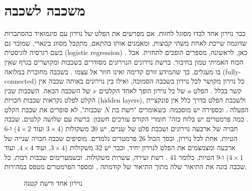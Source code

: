 \section{משכבה לשכבה}
כבר נוירון אחד לבדו מסוגל לחזות. אם מפרשים את הפלט של נוירון עם סיגמואיד כהסתברות שדוגמה שייכת לאחת משתי קבוצות, ומאמנים אותו בהתאם, מתקבל מסווג בינארי, שמוכר גם בשם רגרסיה לוגיסטית (logistic regression) \cite{S-ch03-01}. כאן, לראשונה, מספרים הופכים לתחזית.
אבל הכוח האמיתי טמון בחיבור. ברשת נוירונים הנוירונים מסודרים בשכבות ומקושרים בגרף שאין בו מעגלים, כך שהמידע זורם קדימה ואינו חוזר אל עצמו \cite{S-ch03-01}. בשכבה מחוברת במלואה (fully-connected) כל נוירון מקושר לכל נוירון בשכבה הסמוכה, ואילו בין נוירונים באותה שכבה אין קשר בכלל \cite{S-ch03-01}. הפלט $a$ של כל נוירון הופך לאחד הקלטים $x$ של השכבה הבאה. השכבות שבין הקלט לפלט נקראות שכבות חבויות (hidden layers), ולשכבת הפלט בדרך כלל אין פונקציית הפעלה \cite{S-ch03-01}. ובספירה יש מוסכמה: כשאומרים "רשת בת $N$ שכבות", לא סופרים את שכבת הקלט \cite{S-ch03-01}.
כמה פרמטרים יש בלוח כזה? חומרי הקורס עורכים חשבון: ברשת עם שלושה קלטים, שכבה חבויה של ארבעה נוירונים ושכבת פלט של שניים, יש 20 משקולות ($3\times4$ ועוד $4\times2$) ו-6 הטיות, אחת לכל נוירון, ובסך הכול 26 פרמטרים נלמדים. מוסיפים שכבה חבויה שנייה של ארבעה ומצמצמים את הפלט לנוירון יחיד, וכבר יש 32 משקולות ($3\times4$, ועוד $4\times4$, ועוד $4\times1$) ו-9 הטיות, כלומר 41 \cite{S-ch03-01}. רשת זעירה, עשרות משקולות. וכשמערימים שכבות רבות, כל שכבה בונה את התיאור שלה מתוך התיאור של קודמתה \cite{S-ch01-05}, ומספר הפרמטרים מטפס במהירות.
\begin{figure}[htbp]
\centering

\caption{נוירון אחד ורשת קטנה}\label{fig:3.2}
\end{figure}
